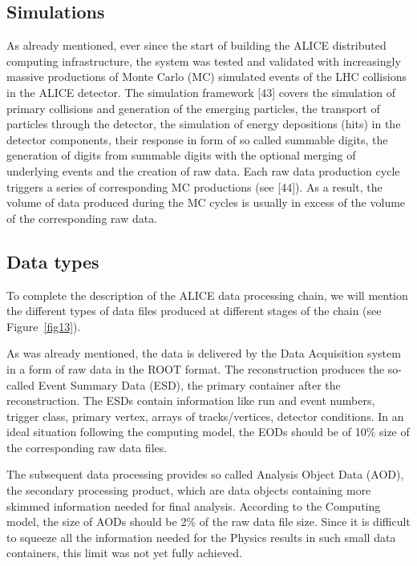 \subsection{Simulations}
%
As already mentioned, ever since the start of building the ALICE
distributed computing infrastructure, the system was tested and
validated with increasingly massive productions  of Monte Carlo (MC)
simulated events of the LHC collisions in the ALICE detector. The
simulation framework [43] covers the simulation of primary collisions
and generation of the emerging particles, the transport of particles
through the detector, the simulation of energy depositions (hits) in
the detector components, their response in form of so called
summable digits, the generation of digits from summable digits with
the optional merging of underlying events and the creation of raw
data. Each raw data production cycle triggers a series of
corresponding MC productions (see [44]). As a result, the volume of
data produced during the MC cycles is usually in excess of the
volume of the corresponding raw data.

\subsection{Data types}
%
To complete the description of the ALICE data processing chain, we
will mention the different types of data files produced at different
stages of the chain (see Figure~\ref{fig13}).

As was already mentioned, the data is delivered by the Data
Acquisition system in a form of raw data in the ROOT format. The
reconstruction produces the so-called Event Summary Data (ESD), the
primary container after the reconstruction. The ESDs contain
information like run and event numbers, trigger class, primary
vertex, arrays of tracks/vertices, detector conditions. In an ideal
situation following the computing model, the EODs should be of 10\%
size of the corresponding raw data files.

The subsequent data processing provides so called Analysis Object
Data (AOD), the secondary processing product, which are data objects
containing more skimmed information needed for final analysis.
According to the Computing model, the size of AODs should be 2\% of
the raw data file size. Since it is difficult to squeeze all the
information needed for the Physics results in such small data
containers, this limit was not yet fully achieved.

